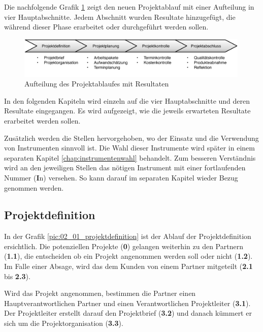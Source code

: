 Die nachfolgende Grafik \ref{pic:01_projektablauf} zeigt den neuen Projektablauf 
mit einer Aufteilung in vier Hauptabschnitte. Jedem Abschnitt wurden Resultate
hinzugefügt, die während dieser Phase erarbeitet oder durchgeführt werden sollen.

\begin{figure}[htbp]
\begin{center}
\includegraphics[width=0.99\textwidth,angle=0]{./bilder/loesung/01_projektablauf.pdf}
\caption[Aufteilung des Projektablaufes mit Resultaten]{Aufteilung des Projektablaufes mit Resultaten\footnotemark}
\label{pic:01_projektablauf}
\end{center}
\end{figure}

In den folgenden Kapiteln wird einzeln auf die vier Hauptabschnitte und deren
Resultate eingegangen. Es wird aufgezeigt, wie die jeweils erwarteten Resultate 
erarbeitet werden sollen.

Zusätzlich werden die Stellen hervorgehoben, wo der Einsatz und die Verwendung 
von Instrumenten sinnvoll ist. Die Wahl dieser Instrumente wird später in einem
separaten Kapitel \ref{chap:instrumentenwahl} behandelt. Zum besseren Verständnis
wird an den jeweiligen Stellen das nötigen Instrument mit einer fortlaufenden
Nummer (\textbf{I}n) versehen. So kann darauf im separaten Kapitel wieder Bezug 
genommen werden.

\subsection{Projektdefinition}
In der Grafik \ref{pic:02_01_projektdefinition} ist der Ablauf der Projektdefinition 
ersichtlich. Die potenziellen Projekte (\textbf{0}) gelangen weiterhin zu den
Partnern (\textbf{1.1}), die entscheiden ob ein Projekt angenommen werden soll
oder nicht (\textbf{1.2}). Im Falle einer Absage, wird das dem Kunden von einem
Partner mitgeteilt (\textbf{2.1} bis \textbf{2.3}).

Wird das Projekt angenommen, bestimmen die Partner einen Hauptverantwortlichen
Partner und einen Verantwortlichen Projektleiter (\textbf{3.1}). Der Projektleiter
erstellt darauf den Projektbrief (\textbf{3.2}) und danach kümmert er sich um
die Projektorganisation (\textbf{3.3}).

